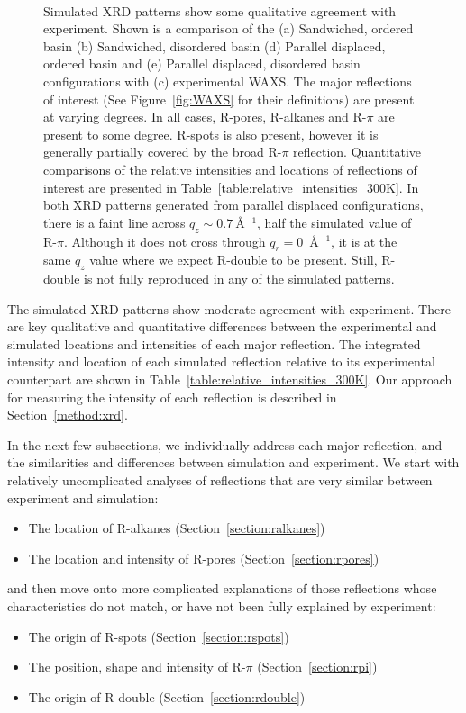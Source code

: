 \documentclass[journal=jpcbfk,manuscript=article]{achemso}
\begin{document}
\begin{figure}[!htb]
\begin{subfigure}{0.085\textwidth}
	\end{subfigure}	
	\caption{Simulated XRD patterns show some qualitative agreement with
		experiment. Shown is a comparison of the (a) Sandwiched, ordered basin (b)
		Sandwiched, disordered basin (d) Parallel displaced, ordered basin and (e)
		Parallel displaced, disordered basin configurations with (c) experimental WAXS.
		The major reflections of interest (See Figure~\ref{fig:WAXS} for their
		definitions) are present at varying degrees. In all cases, R-pores, R-alkanes
		and R-$\pi$ are present to some degree. R-spots is also present, however it is
		generally partially covered by the broad R-$\pi$ reflection. Quantitative
		comparisons of the relative intensities and locations of reflections of
		interest are presented in Table~\ref{table:relative_intensities_300K}. In both
		XRD patterns generated from parallel displaced configurations, there is a faint line
		across $q_z \sim 0.7~$\AA$^{-1}$, half the simulated value of R-$\pi$. Although
		it does not cross through $q_r = 0$~\AA$^{-1}$, it is at the same $q_z$ value
		where we expect R-double to be present. Still, R-double is not fully reproduced
		in any of the simulated patterns.}~\label{fig:XRDsim} 
  \end{figure}
  
  The simulated XRD patterns show moderate agreement with experiment. There 
  are key qualitative and quantitative differences between the experimental and simulated
  locations and intensities of each major reflection. The integrated intensity and location
  of each simulated reflection relative to its experimental counterpart are shown in  
  Table~\ref{table:relative_intensities_300K}. Our approach for measuring the intensity of
  each reflection is described in Section~\ref{method:xrd}. 

  In the next few subsections, we individually address each major reflection, and the
  similarities and differences between simulation and experiment. We start with relatively 
  uncomplicated analyses of reflections that are very similar between experiment and simulation:
  \begin{itemize}
  	\item The location of R-alkanes (Section~\ref{section:ralkanes})
  	\item The location and intensity of R-pores (Section~\ref{section:rpores})
  \end{itemize}
  and then move onto more complicated explanations of those reflections whose characteristics
  do not match, or have not been fully explained by experiment:
  \begin{itemize}
  	\item The origin of R-spots (Section~\ref{section:rspots})
  	\item The position, shape and intensity of R-$\pi$ (Section~\ref{section:rpi})
  	\item The origin of R-double (Section~\ref{section:rdouble})
  \end{itemize}
  
\end{document}
